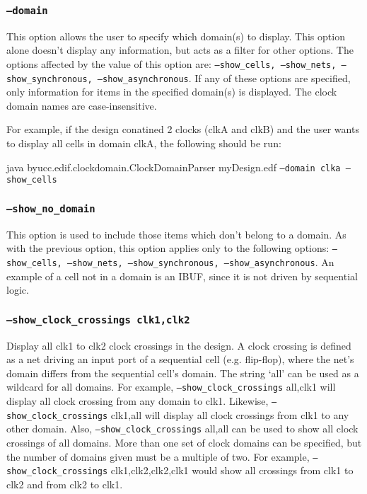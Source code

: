 \subsubsection{\texttt{--domain}}
This option allows the user to specify which domain(s) to display.  This option
alone doesn't display any information, but acts as a filter for other options. 
The options affected by the value of this option are:
\texttt{--show\_cells, --show\_nets, --show\_synchronous, --show\_asynchronous}.
If any of these options are specified, only information for items in the
specified domain(s) is displayed. The clock domain names are case-insensitive.

For example, if the design conatined 2 clocks (clkA and clkB) and the user wants
to display all cells in domain clkA, the following should be run:

java byucc.edif.clockdomain.ClockDomainParser myDesign.edf \texttt{--domain clka
--show\_cells}

\subsubsection{\texttt{--show\_no\_domain}}
This option is used to include those items which don't belong to a domain. As
with the previous option, this option applies only to the following options:
\texttt{--show\_cells, --show\_nets, --show\_synchronous, --show\_asynchronous}.
An example of a cell not in a domain is an IBUF, since it is not driven by
sequential logic.

\subsubsection{\texttt{--show\_clock\_crossings clk1,clk2}}
Display all clk1 to clk2 clock crossings in the design.  A clock crossing is
defined as a net driving an input port of a sequential cell (e.g. flip-flop), 
where the net's domain differs from the sequential cell's domain.  The string
`all' can be used as a wildcard for all domains.  For example,
\texttt{--show\_clock\_crossings} all,clk1 will display all clock crossing from
any domain to clk1.  Likewise, \texttt{--show\_clock\_crossings} clk1,all will
display all clock crossings from clk1 to any other domain.  Also,
\texttt{--show\_clock\_crossings} all,all can be used to show all clock
crossings of all domains.  More than one set of clock domains can be specified,
but the number of domains given must be a multiple of two.  For example,
\texttt{--show\_clock\_crossings} clk1,clk2,clk2,clk1 would show all crossings
from clk1 to clk2 and from clk2 to clk1.

